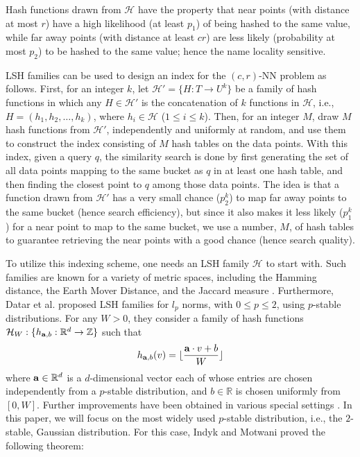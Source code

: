 \documentclass{acm_proc_article-sp}
\numberwithin{equation}{section}
\numberwithin{figure}{section}
\begin{document}
Hash functions drawn from $\mathcal{H}$ have the property that near points (with distance at most $r$) have a high likelihood (at least $p_1$) of being hashed to the same value, while far away points (with distance at least $cr$) are less likely (probability at most $p_2$) to be hashed to the same value; hence the name locality sensitive. 

LSH families can be used to design an index for the $(c,r)$-NN problem as follows. First, for an integer $k$, let $\mathcal{H'}= \{H: T \to U^k\}$ be a family of hash functions in which any $H\in \mathcal{H'}$ is the concatenation of $k$ functions in $\mathcal{H}$, i.e., $H=(h_1, h_2, \ldots, h_k)$, where $h_i\in \mathcal{H}$ ($1\leq i\leq k$). Then, for an integer $M$, draw $M$ hash functions from $\mathcal{H'}$, independently and uniformly at random, and use them to construct the index consisting of $M$ hash tables on the data points. With this index, given a query $q$, the similarity search is done by first generating the set of all data points mapping to the same bucket as $q$ in at least one hash table, and then finding the closest point to $q$ among those data points. The idea is that a function drawn from $\mathcal{H'}$ has a very small chance ($p_2^k$) to map far away points to the same bucket (hence search efficiency), but since it also makes it less likely ($p_1^k$) for a near point to map to the same bucket, we use a number, $M$, of hash tables to guarantee retrieving the near points with a good chance (hence search quality).






To utilize this indexing scheme, one needs an LSH family $\mathcal{H}$ to start with. Such families are known for a variety of metric spaces, including the Hamming distance, the Earth Mover Distance, and the Jaccard measure \cite{C02}. Furthermore, Datar et al. \cite{DIIM04} proposed LSH families for $l_p$ norms, with $0\leq p\leq 2$, using $p$-stable distributions. For any $W > 0$, they consider a family of hash functions $\mathcal{H}_W:\{h_{{\bf a},b}: \mathbb{R}^d \to \mathbb{Z} \}$ such that 
$$h_{{\bf a},b}(v) = \lfloor \frac{{\bf a} \cdot v+b}{W}\rfloor $$ 
where ${\bf a} \in \mathbb{R}^d$ is a $d$-dimensional vector each of whose entries are chosen independently from a $p$-stable distribution, and $b\in \mathbb{R}$ is chosen uniformly from $[0,W]$. Further improvements have been obtained in various special settings \cite{AI06}. In this paper, we will focus on the most widely used $p$-stable distribution, i.e., the $2$-stable, Gaussian distribution. For this case, Indyk and Motwani \cite{im98} proved the following theorem: 
\end{document}

